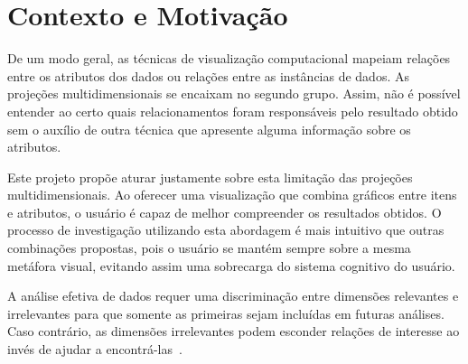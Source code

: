 

\section{Contexto e Motivação}

De um modo geral, as técnicas de visualização computacional mapeiam relações entre os atributos dos dados ou relações entre as instâncias de dados. As projeções multidimensionais se encaixam no segundo grupo. Assim, não é possível entender ao certo quais relacionamentos foram responsáveis pelo resultado obtido sem o auxílio de outra técnica que apresente alguma informação sobre os atributos.

Este projeto propõe aturar justamente sobre esta limitação das projeções multidimensionais. Ao oferecer uma visualização que combina gráficos entre itens e atributos, o usuário é capaz de melhor compreender os resultados obtidos. O processo de investigação utilizando esta abordagem é mais intuitivo que outras combinações propostas, pois o usuário se mantém sempre sobre a mesma metáfora visual, evitando assim uma sobrecarga do sistema cognitivo do usuário.

A análise efetiva de dados requer uma discriminação entre dimensões relevantes e irrelevantes para que somente as primeiras sejam incluídas em futuras análises. Caso contrário, as dimensões irrelevantes podem esconder relações de interesse ao invés de ajudar a encontrá-las~\cite{Guo2003}. 

